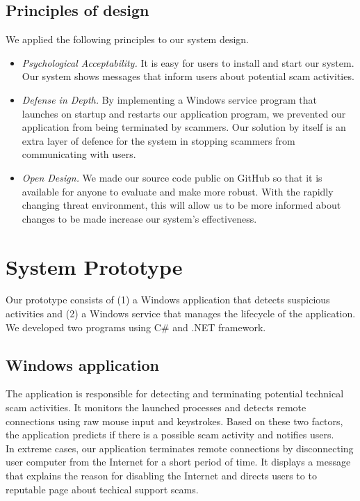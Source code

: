 \documentclass[final]{IEEEtran}
\begin{document}
\subsection{Principles of design}
We applied the following principles to our system design.
\begin{itemize}
  \item\textit{ Psychological Acceptability.} It is easy for users to install and start our system. Our system shows messages that inform users about potential scam activities. 
  \item\textit{ Defense in Depth.} By implementing a Windows service program that launches on startup and restarts our application program, we prevented our application from being terminated by scammers. Our solution by itself is an extra layer of defence for the system in stopping scammers from communicating with users.
  \item\textit{ Open Design.} We made our source code public on GitHub so that it is available for anyone to evaluate and make more robust. With the rapidly changing threat environment, this will allow us to be more informed about changes to be made increase our system's effectiveness.
\end{itemize}

\section{System Prototype} %
Our prototype consists of (1) a Windows application that detects suspicious activities and (2) a Windows service that manages the lifecycle of the application. We developed two programs using C\# and .NET framework. 

\subsection{Windows application}
The application is responsible for detecting and terminating potential technical scam activities. It monitors the launched processes and detects remote connections using raw mouse input and keystrokes. Based on these two factors, the application predicts if there is a possible scam activity and notifies users.\\
In extreme cases, our application terminates remote connections by disconnecting user computer from the Internet for a short period of time. It displays a message that explains the reason for disabling the Internet and directs users to to reputable page about techical support scams.
\end{document}
